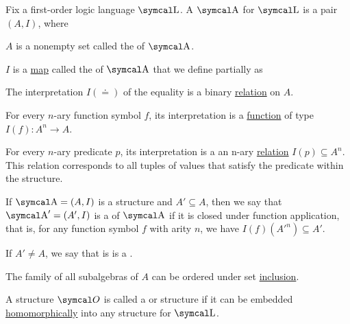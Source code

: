 \begin{definition}\label{def:first_order_structure}\cite[definition 14.27]{OpenLogic20201202}
  Fix a first-order logic language \( \CL \). A  \( \CA \) for \( \CL \) is a pair \( (A, I) \), where
  \begin{defenum}
     \( A \) is a nonempty set called the  of \( \CA \).

     \( I \) is a \hyperref[def:function]{map} called the  of \( \CA \) that we define partially as
    \begin{defenum}
       The interpretation \( I(\doteq) \) of the equality is a binary \hyperref[def:binary_relation]{relation} on \( A \).

       For every \( n \)-ary function symbol \( f \), its interpretation is a \hyperref[def:function]{function} of type \( I(f): A^n \to A \).

       For every \( n \)-ary predicate \( p \), its interpretation is a an n-ary \hyperref[def:relation]{relation} \( I(p) \subseteq A^n \). This relation corresponds to all tuples of values that satisfy the predicate within the structure.
    \end{defenum}
  \end{defenum}
\end{definition}

\begin{definition}\label{def:first_order_substructure}
  If \( \CA = (A, I) \) is a structure and \( A' \subseteq A \), then we say that \( \CA' = (A', I) \) is a  of \( \CA \) if it is closed under function application, that is, for any function symbol \( f \) with arity \( n \), we have \( I(f)(A'^n) \subseteq A' \).

  If \( A' \neq A \), we say that is is a .

  The family of all subalgebras of \( A \) can be ordered under set \hyperref[def:subset]{inclusion}.

  A structure \( \Cal{O} \) is called a  or  structure if it can be embedded \hyperref[def:first_order_homomorphism/embedding]{homomorphically} into any structure for \( \CL \).
\end{definition}

